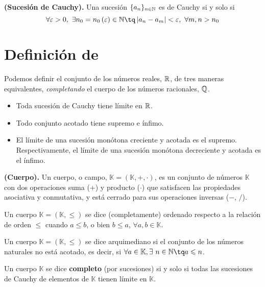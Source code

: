 {\begin{defi}
    \textbf{(Sucesión de Cauchy).} Una sucesión $\{a_n\}_{n\in\mathbb{N}} $ es de Cauchy si y solo si
    \begin{equation}
        \forall\epsilon > 0,\ \exists n_0 = n_0\left( \epsilon \right) \in\N\tq \abs{a_n - a_m} < \epsilon,\ \forall m, n > n_0
    \end{equation}
\end{defi}

\section{Definición de \R}
Podemos definir el conjunto de los números reales, $\mathbb{R}$, de tres maneras equivalentes, \textit{completando} el cuerpo de los números racionales, $\mathbb{Q}$.
\begin{itemize}
    \item Toda sucesión de Cauchy tiene límite en $\mathbb{R}$.
    \item Todo conjunto acotado tiene supremo e ínfimo.
    \item El límite de una sucesión monótona creciente y acotada es el supremo. Respectivamente, el límite de una sucesión monótona decreciente y acotada es el ínfimo.
\end{itemize}

\begin{defi}
    \textbf{(Cuerpo).} Un cuerpo, o campo, $\mathbb{K} = \left(\mathbb{K}, +, \cdot\right)$, es un conjunto de números $\mathbb{K}$ con dos operaciones suma ($+$) y producto ($\cdot$) que satisfacen las propiedades asociativa y conmutativa, y está cerrado para sus operaciones inversas ($-$, $/$).
\end{defi}

\begin{defi}
    Un cuerpo $\mathbb{K} = \left(\mathbb{K}, \leq\right)$ se dice (completamente) ordenado respecto a la relación de orden $\leq$ cuando $a\leq b$, o bien $b\leq a$, $\forall a, b\in\mathbb{K}$.
\end{defi}

\begin{defi}
    Un cuerpo $\mathbb{K} = \left(\mathbb{K}, \leq\right)$ se dice arquimediano si el conjunto de los números naturales no está acotado, es decir, si $\forall a\in\mathbb{K}, \exists\ n\in\N\tq a\leq n$.
\end{defi}

\begin{defi}
    Un cuerpo $\mathbb{K}$ se dice \textbf{completo} (por sucesiones) si y solo si todas las sucesiones de Cauchy de elementos de $\mathbb{K}$ tienen límite en $\mathbb{K}$.
\end{defi}

}
